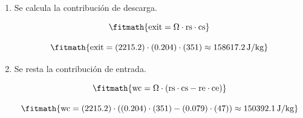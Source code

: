 \begin{enumerate}

\item Se calcula la contribución de descarga.

\[\fitmath{\mathrm{exit}=\Omega\cdot \mathrm{rs}\cdot \mathrm{cs}}\]

\[\fitmath{\mathrm{exit}=(2215.2)\cdot (0.204)\cdot (351)\approx 158617.2\,\mathrm{J/kg}}\]

\item Se resta la contribución de entrada.

\[\fitmath{\mathrm{wc}=\Omega\cdot \left(\mathrm{rs}\cdot \mathrm{cs}-\mathrm{re}\cdot \mathrm{ce}\right)}\]

\[\fitmath{\mathrm{wc}=(2215.2)\cdot \left((0.204)\cdot (351)-(0.079)\cdot (47)\right)\approx 150392.1\,\mathrm{J/kg}}\]

\end{enumerate}

